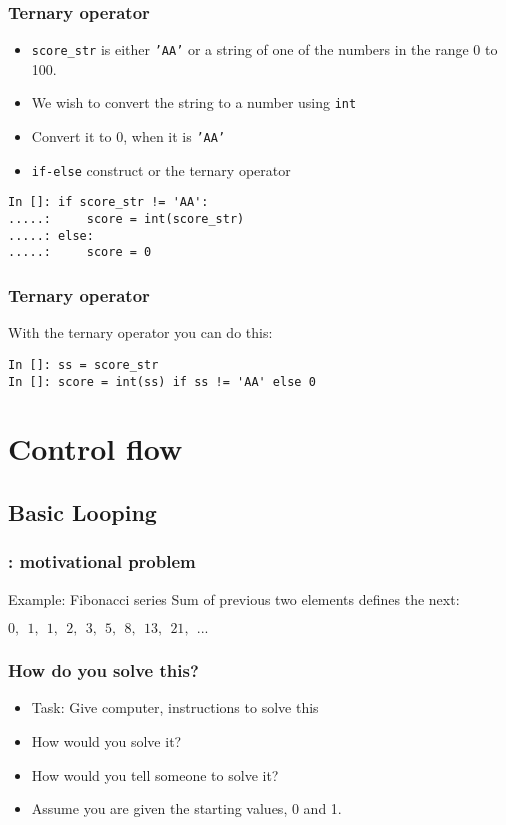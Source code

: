 \documentclass[14pt,compress]{beamer}
\begin{document}
\begin{frame}[fragile]
  \frametitle{Ternary operator}
  \begin{itemize}
  \item \texttt{score\_str} is either \texttt{'AA'} or a string of one
    of the numbers in the range 0 to 100.
  \item We wish to convert the string to a number using \texttt{int}
  \item Convert it to 0, when it is \texttt{'AA'}
  \item \texttt{if-else} construct or the ternary operator
  \end{itemize}
  \begin{lstlisting}
In []: if score_str != 'AA':
.....:     score = int(score_str)
.....: else:
.....:     score = 0
  \end{lstlisting}
\end{frame}
\begin{frame}[fragile]
  \frametitle{Ternary operator}
  With the ternary operator you can do this:
  \small
  \begin{lstlisting}
In []: ss = score_str
In []: score = int(ss) if ss != 'AA' else 0
  \end{lstlisting}
\end{frame}


\section{Control flow}
\subsection{Basic Looping}

\begin{frame}
  \frametitle{: motivational problem}
\begin{block}{Example: Fibonacci series}
  Sum of previous two elements defines the next:
  \begin{center}
    $0,\ \ 1,\ \ 1,\ \ 2,\ \ 3,\ \ 5,\ \ 8,\ \ 13,\ \ 21,\ \ ...$
  \end{center}
\end{block}
\end{frame}

\begin{frame}
  \frametitle{How do you solve this?}
  \begin{itemize}
  \item Task: Give computer, instructions to solve this
    \vspace*{2em}
  \item How would you solve it?
  \item How would you tell someone to solve it?
    \vspace*{1em}
  \item Assume you are given the starting values, 0 and 1.
  \end{itemize}

\end{frame}
\end{document}
